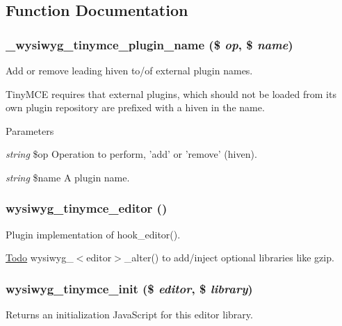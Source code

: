 \subsection{Function Documentation}
\hypertarget{tinymce_8inc_a180b1846fb5918efa67ce09059efb41e}{
\subsubsection[{\_\-wysiwyg\_\-tinymce\_\-plugin\_\-name}]{\setlength{\rightskip}{0pt plus 5cm}\_\-wysiwyg\_\-tinymce\_\-plugin\_\-name (\$ {\em op}, \/  \$ {\em name})}}
\label{tinymce_8inc_a180b1846fb5918efa67ce09059efb41e}
Add or remove leading hiven to/of external plugin names.

TinyMCE requires that external plugins, which should not be loaded from its own plugin repository are prefixed with a hiven in the name.


\begin{DoxyParams}{Parameters}
\item[{\em string}]\$op Operation to perform, 'add' or 'remove' (hiven). \item[{\em string}]\$name A plugin name. \end{DoxyParams}
\hypertarget{tinymce_8inc_a20ecffb8ac4c4df58bf2bcbada9dac13}{
\subsubsection[{wysiwyg\_\-tinymce\_\-editor}]{\setlength{\rightskip}{0pt plus 5cm}wysiwyg\_\-tinymce\_\-editor ()}}
\label{tinymce_8inc_a20ecffb8ac4c4df58bf2bcbada9dac13}
Plugin implementation of hook\_\-editor().

\begin{Desc}
\item[\hyperlink{todo__todo000090}{Todo}]wysiwyg\_\-$<$editor$>$\_\-alter() to add/inject optional libraries like gzip. \end{Desc}
\hypertarget{tinymce_8inc_a85d07084954b0a9d004e0491a07d424b}{
\subsubsection[{wysiwyg\_\-tinymce\_\-init}]{\setlength{\rightskip}{0pt plus 5cm}wysiwyg\_\-tinymce\_\-init (\$ {\em editor}, \/  \$ {\em library})}}
\label{tinymce_8inc_a85d07084954b0a9d004e0491a07d424b}
Returns an initialization JavaScript for this editor library.


